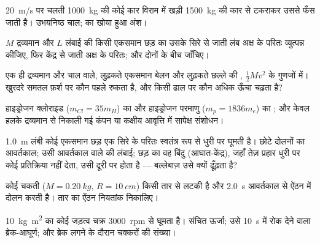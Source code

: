 \begin{exercise}[$\star$]\label{exo:b1:systems-of-points:3}
\qty{20}{m/s} पर चलती \qty{1000}{kg} की कोई कार विराम में खड़ी
\qty{1500}{kg} की कार से टकराकर उससे फँस जाती है। उभयनिष्ठ चाल;  का खोया हुआ अंश।
\end{exercise}

\begin{exercise}[$\star$]\label{exo:b1:systems-of-points:4}
$M$ द्रव्यमान और $L$ लंबाई की किसी एकसमान छड़ का  उसके सिरे
से जाती लंब अक्ष के परितः व्युत्पन्न कीजिए, फिर केंद्र से जाती अक्ष के
परितः; और दोनों के बीच  जाँचिए।
\end{exercise}

\begin{exercise}[$\star\star$]\label{exo:b1:systems-of-points:5}
एक ही द्रव्यमान और चाल वाले, लुढ़कते एकसमान बेलन और लुढ़कते छल्ले की , $\tfrac12 Mv^2$ के गुणजों में। खुरदरे समतल फ़र्श पर कौन पहले
रुकता है, और किसी ढाल पर कौन अधिक ऊँचा चढ़ता है?
\end{exercise}

\begin{exercise}[$\star\star$]\label{exo:b1:systems-of-points:6}
हाइड्रोजन क्लोराइड ($m_{Cl} = 35m_H$) का और हाइड्रोजन परमाणु
($m_p = 1836m_e$) का ; और केवल हलके द्रव्यमान से निकाली
गई कंपन या कक्षीय आवृत्ति में सापेक्ष संशोधन।
\end{exercise}

\begin{exercise}[$\star\star$]\label{exo:b1:systems-of-points:7}
\qty{1.0}{m} लंबी कोई एकसमान छड़ एक सिरे के परितः स्वतंत्र रूप से धुरी पर
घूमती है। छोटे दोलनों का आवर्तकाल; उसी आवर्तकाल वाले  की लंबाई;
छड़ का वह बिंदु (आघात-केंद्र), जहाँ तेज़ प्रहार धुरी पर कोई प्रतिक्रिया
नहीं देता, उसी दूरी पर होता है --- बल्लेबाज़ उसे क्यों ढूँढ़ता है?
\end{exercise}

\begin{exercise}[$\star\star$]\label{exo:b1:systems-of-points:8}
कोई चकती ($M = \qty{0.20}{kg}$, $R = \qty{10}{cm}$) किसी तार से लटकी है और
\qty{2.0}{s} आवर्तकाल से ऐंठन में दोलन करती है। तार का ऐंठन नियतांक
निकालिए।
\end{exercise}

\begin{exercise}[$\star\star$]\label{exo:b1:systems-of-points:9}
\qty{10}{kg.m^2}  का कोई जड़त्व चक्र \qty{3000}{rpm} से घूमता
है। संचित ऊर्जा; उसे \qty{10}{s} में रोक देने वाला ब्रेक-आघूर्ण; और ब्रेक
लगने के दौरान चक्करों की संख्या।
\end{exercise}


